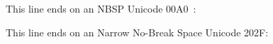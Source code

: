 This line ends on an NBSP Unicode 00A0~:

This line ends on an Narrow No-Break Space Unicode 202F\nobreak\hspace{.16667em plus .08333em}:

